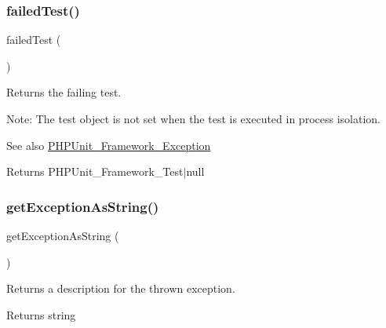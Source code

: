 \subsubsection{\texorpdfstring{failed\+Test()}{failedTest()}}
{\footnotesize\ttfamily failed\+Test (\begin{DoxyParamCaption}{ }\end{DoxyParamCaption})}

Returns the failing test.

Note\+: The test object is not set when the test is executed in process isolation.

\begin{DoxySeeAlso}{See also}
\mbox{\hyperlink{class_p_h_p_unit___framework___exception}{P\+H\+P\+Unit\+\_\+\+Framework\+\_\+\+Exception}}
\end{DoxySeeAlso}
\begin{DoxyReturn}{Returns}
P\+H\+P\+Unit\+\_\+\+Framework\+\_\+\+Test$\vert$null 
\end{DoxyReturn}
\mbox{\label{class_p_h_p_unit___framework___test_failure_af5ab125fcd6e125ddf02594c56eadf8b}} 
\subsubsection{\texorpdfstring{get\+Exception\+As\+String()}{getExceptionAsString()}}
{\footnotesize\ttfamily get\+Exception\+As\+String (\begin{DoxyParamCaption}{ }\end{DoxyParamCaption})}

Returns a description for the thrown exception.

\begin{DoxyReturn}{Returns}
string 
\end{DoxyReturn}
\mbox{\label{class_p_h_p_unit___framework___test_failure_af10615e21287d59c3ce1623fa03d79ac}} 
